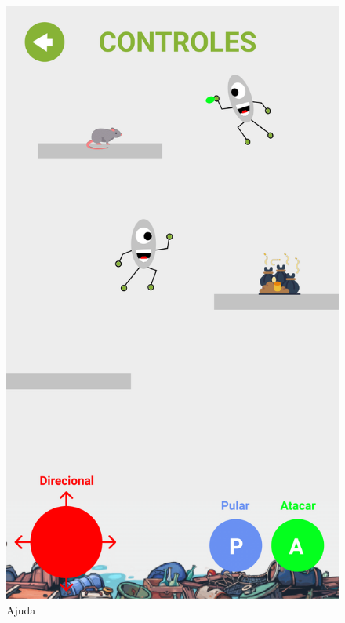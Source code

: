\documentclass[]{scrartcl}
\begin{document}
\begin{figure}[H]
	\begin{center}
		\includegraphics[scale=0.3]{figs/Game Design-19.png}
		\caption{Ajuda}
	\end{center}
\end{figure}
\end{document}
